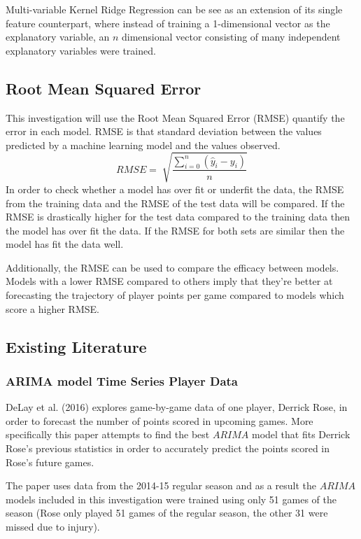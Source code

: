 \documentclass[a4paper,11pt,twoside]{article}
\begin{document}
Multi-variable Kernel Ridge Regression can be see as an extension of its single feature counterpart, where instead of training a 1-dimensional vector as the explanatory variable, an $n$ dimensional vector consisting of many independent explanatory variables were trained.


\subsection{Root Mean Squared Error}
This investigation will use the Root Mean Squared Error (RMSE) quantify the error in each model. RMSE is that standard deviation between the values predicted by a machine learning model and the values observed.
\begin{equation}
RMSE = \sqrt[]{\frac{\sum_{i=0}^{n}(\hat{y}_{i} - y_{i})}{n}}
\end{equation}
In order to check whether a model has over fit or underfit the data, the RMSE from the training data and the RMSE of the test data will be compared. If the RMSE is drastically higher for the test data compared to the training data then the model has over fit the data. If the RMSE for both sets are similar then the model has fit the data well. 

Additionally, the RMSE can be used to compare the efficacy between models. Models with a lower RMSE compared to others imply that they're better at forecasting the trajectory of player points per game compared to models which score a higher RMSE.


\subsection{Existing Literature}
 
\subsubsection{ARIMA model Time Series Player Data \cite{DeLay2016}} 

DeLay et al. (2016) explores game-by-game data of one player, Derrick Rose, in order to forecast the number of points scored in upcoming games. More specifically this paper attempts to find the best $ARIMA$ model that fits Derrick Rose's previous statistics in order to accurately predict the points scored in Rose's future games.

The paper uses data from the 2014-15 regular season and as a result the $ARIMA$ models included in this investigation were trained using only 51 games of the season (Rose only played 51 games of the regular season, the other 31 were missed due to injury).
\end{document}
